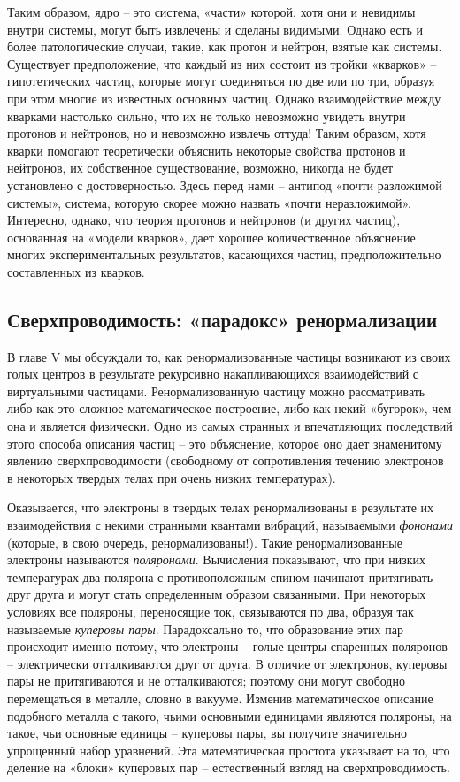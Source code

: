 \documentclass[../main.tex]{subfiles}
\begin{document}
Таким образом, ядро \--- это система, «части» которой, хотя они и невидимы внутри системы, могут быть извлечены и сделаны видимыми. Однако есть и более патологические случаи, такие, как протон и нейтрон, взятые как системы. Существует предположение, что каждый из них состоит из тройки «кварков» \--- гипотетических частиц, которые могут соединяться по две или по три, образуя при этом многие из известных основных частиц. Однако взаимодействие между кварками настолько сильно, что их не только невозможно увидеть внутри протонов и нейтронов, но и невозможно извлечь оттуда! Таким образом, хотя кварки помогают теоретически объяснить некоторые свойства протонов и нейтронов, их собственное существование, возможно, никогда не будет установлено с достоверностью. Здесь перед нами \--- антипод «почти разложимой системы», система, которую скорее можно назвать «почти неразложимой». Интересно, однако, что теория протонов и нейтронов (и других частиц), основанная на «модели кварков», дает хорошее количественное объяснение многих экспериментальных результатов, касающихся частиц, предположительно составленных из кварков.


\subsection{Сверхпроводимость: «парадокс» ренормализации}

В главе V мы обсуждали то, как ренормализованные частицы возникают из своих голых центров в результате рекурсивно накапливающихся взаимодействий с виртуальными частицами. Ренормализованную частицу можно рассматривать либо как это сложное математическое построение, либо как некий «бугорок», чем она и является физически. Одно из самых странных и впечатляющих последствий этого способа описания частиц \--- это объяснение, которое оно дает знаменитому явлению сверхпроводимости (свободному от сопротивления течению электронов в некоторых твердых телах при очень низких температурах).

Оказывается, что электроны в твердых телах ренормализованы в результате их взаимодействия с некими странными квантами вибраций, называемыми \emph{фононами} (которые, в свою очередь, ренормализованы!). Такие ренормализованные электроны называются \emph{поляронами}. Вычисления показывают, что при низких температурах два полярона с противоположным спином начинают притягивать друг друга и могут стать определенным образом связанными. При некоторых условиях все поляроны, переносящие ток, связываются по два, образуя так называемые \emph{куперовы пары}. Парадоксально то, что образование этих пар происходит именно потому, что электроны \--- голые центры спаренных поляронов \--- электрически отталкиваются друг от друга. В отличие от электронов, куперовы пары не притягиваются и не отталкиваются; поэтому они могут свободно перемещаться в металле, словно в вакууме. Изменив математическое описание подобного металла с такого, чьими основными единицами являются поляроны, на такое, чьи основные единицы \--- куперовы пары, вы получите значительно упрощенный набор уравнений. Эта математическая простота указывает на то, что деление на «блоки» куперовых пар \--- естественный взгляд на сверхпроводимость.
\end{document}
